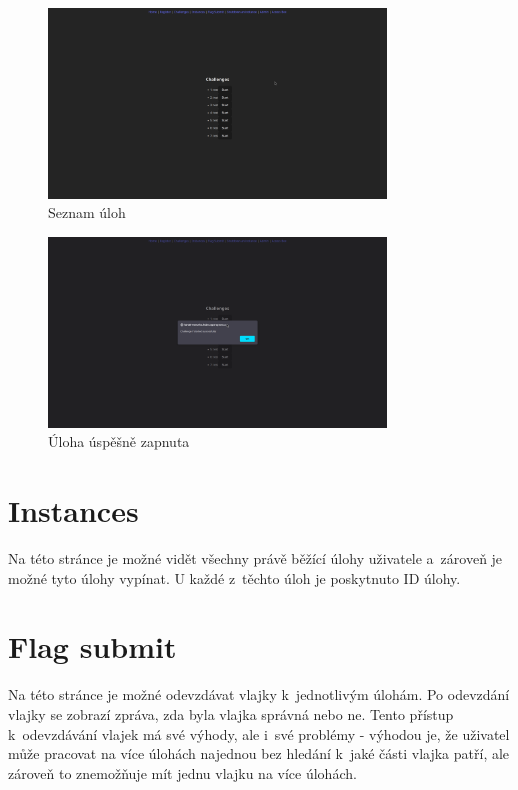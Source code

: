 \documentclass[12pt, a4paper,
oneside,      %
openright
]{report}
\begin{document}
\begin{figure}[h]
	\centering
	\includegraphics[width=0.8\textwidth]{02-challenges.png}
	\caption{Seznam úloh}
	\label{fig:frontend-challenges}
\end{figure}

\begin{figure}[h]
	\centering
	\includegraphics[width=0.8\textwidth]{03-challenges_success.png}
	\caption{Úloha úspěšně zapnuta}
	\label{fig:frontend-challenges-success}
\end{figure}

\section{Instances}
Na této stránce je možné vidět všechny právě běžící úlohy uživatele a~zároveň je možné tyto úlohy vypínat. U každé z~těchto úloh je poskytnuto ID úlohy.


\section{Flag submit}
Na této stránce je možné odevzdávat vlajky k~jednotlivým úlohám. Po odevzdání vlajky se zobrazí zpráva, zda byla vlajka správná nebo ne. Tento přístup k~odevzdávání vlajek má své výhody, ale i~své problémy - výhodou je, že uživatel může pracovat na více úlohách najednou bez hledání k~jaké části vlajka patří, ale zároveň to znemožňuje mít jednu vlajku na více úlohách.
\end{document}
